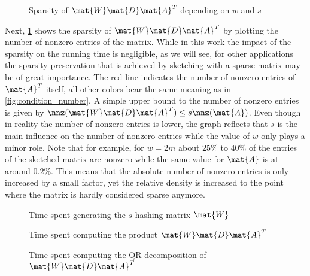 \begin{figure}[tbp]%
  \centering%
  \caption{Sparsity of \(\mat{W}\mat{D}\mat{A}^T\) depending on \(w\) and \(s\)}%
  \label{fig:sparsity}
\end{figure}%

Next, \cref{fig:sparsity} shows the sparsity of \(\mat{W}\mat{D}\mat{A}^T\) by plotting the number of nonzero entries of the matrix.
While in this work the impact of the sparsity on the running time is negligible, as we will see, for other applications the sparsity preservation that is achieved by sketching with a sparse matrix may be of great importance.
The red line indicates the number of nonzero entries of \(\mat{A}^T\) itself, all other colors bear the same meaning as in \cref{fig:condition_number}.
A simple upper bound to the number of nonzero entries is given by \(\nnz(\mat{W}\mat{D}\mat{A}^T) \leq s \nnz(\mat{A})\).
Even though in reality the number of nonzero entries is lower, the graph reflects that \(s\) is the main influence on the number of nonzero entries while the value of \(w\) only plays a minor role.
Note that for example, for \(w = 2m\) about \(25\%\) to \(40\%\) of the entries of the sketched matrix are nonzero while the same value for \(\mat{A}\) is at around \(0.2\%\).
This means that the absolute number of nonzero entries is only increased by a small factor, yet the relative density is increased to the point where the matrix is hardly considered sparse anymore.

\begin{figure}[tbp]
  \centering
  \caption{Time spent generating the \(s\)-hashing matrix \(\mat{W}\)}%
  \label{fig:generate_sketch_duration}
\end{figure}

\begin{figure}[tbp]
  \centering%
  \caption{Time spent computing the product \(\mat{W}\mat{D}\mat{A}^T\)}%
  \label{fig:sketching_duration}
\end{figure}

\begin{figure}[tbp]
  \centering%
  \caption{Time spent computing the QR decomposition of \(\mat{W}\mat{D}\mat{A}^T\)}%
  \label{fig:decomposition_duration}
\end{figure}

